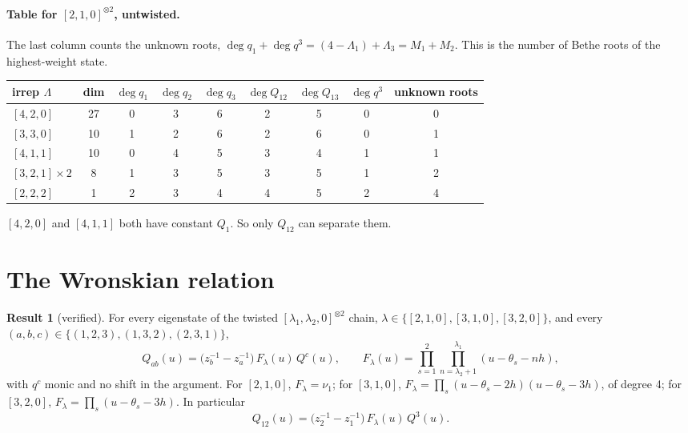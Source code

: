 \documentclass[11pt]{article}
\theoremstyle{definition}
\newtheorem{result}{Result}
\theoremstyle{remark}
\begin{document}
\paragraph{Table for $[2,1,0]^{\otimes2}$, untwisted.}
The last column counts the unknown roots, $\deg q_1+\deg q^3=(4-\Lambda_1)+\Lambda_3=M_1+M_2$. This is the number of Bethe roots of the highest-weight state.
\begin{center}
\begin{tabular}{lcccccccc}\toprule
irrep $\Lambda$ & dim & $\deg q_1$ & $\deg q_2$ & $\deg q_3$ & $\deg Q_{12}$ & $\deg Q_{13}$ & $\deg q^3$ & unknown roots\\\midrule
$[4,2,0]$ & 27 & 0 & 3 & 6 & 2 & 5 & 0 & 0\\
$[3,3,0]$ & 10 & 1 & 2 & 6 & 2 & 6 & 0 & 1\\
$[4,1,1]$ & 10 & 0 & 4 & 5 & 3 & 4 & 1 & 1\\
$[3,2,1]\times2$ & 8 & 1 & 3 & 5 & 3 & 5 & 1 & 2\\
$[2,2,2]$ & 1 & 2 & 3 & 4 & 4 & 5 & 2 & 4\\\bottomrule
\end{tabular}
\end{center}
$[4,2,0]$ and $[4,1,1]$ both have constant $Q_1$. So only $Q_{12}$ can separate them.

\section{The Wronskian relation}

\begin{result}[verified]\label{res:wron}
For every eigenstate of the twisted $[\lambda_1,\lambda_2,0]^{\otimes2}$ chain, $\lambda\in\{[2,1,0],[3,1,0],[3,2,0]\}$, and every $(a,b,c)\in\{(1,2,3),(1,3,2),(2,3,1)\}$,
\begin{equation}\label{eq:wron}
\boxed{\;Q_{ab}(u)=\big(z_b^{-1}-z_a^{-1}\big)\,F_\lambda(u)\,Q^c(u),\qquad F_\lambda(u)=\prod_{s=1}^2\prod_{n=\lambda_2+1}^{\lambda_1}(u-\theta_s-nh),\;}
\end{equation}
with $q^c$ monic and no shift in the argument. For $[2,1,0]$, $F_\lambda=\nu_1$; for $[3,1,0]$, $F_\lambda=\prod_s(u-\theta_s-2h)(u-\theta_s-3h)$, of degree 4; for $[3,2,0]$, $F_\lambda=\prod_s(u-\theta_s-3h)$. In particular
\begin{equation}
Q_{12}(u)=\big(z_2^{-1}-z_1^{-1}\big)\,F_\lambda(u)\,Q^3(u).
\end{equation}
\end{result}
\end{document}
